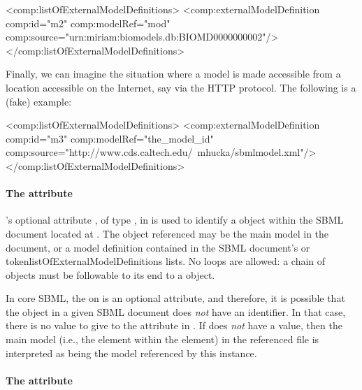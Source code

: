 \begin{example}
<comp:listOfExternalModelDefinitions>
    <comp:externalModelDefinition comp:id="m2" comp:modelRef="mod"
                                  comp:source="urn:miriam:biomodels.db:BIOMD0000000002"/>
</comp:listOfExternalModelDefinitions>
\end{example}

Finally, we can imagine the situation where a model is made accessible
from a location accessible on the Internet, say via the HTTP protocol.
The following is a (fake) example:

\begin{example}
<comp:listOfExternalModelDefinitions>
    <comp:externalModelDefinition comp:id="m3" comp:modelRef="the_model_id"
                                  comp:source="http://www.cds.caltech.edu/~mhucka/sbmlmodel.xml"/>
</comp:listOfExternalModelDefinitions>
\end{example}



\paragraph{The \fixttspace{} attribute}

\ExternalModelDefinition's optional attribute , of type
, in is used to identify a \Model object within the
SBML document located at .  The object referenced may be
the main model in the document, or a model definition contained in the
SBML document's  or 
token{listOfExternalModelDefinitions} lists.  No loops are allowed:
a chain of \ExternalModelDefinition objects must be followable to its end
to a \Model object.

In core SBML, the  on \Model is an optional attribute, and
therefore, it is possible that the \Model object in a given SBML
document does \emph{not} have an identifier.  In that case, there is no
value to give to the  attribute in
\ExternalModelDefinition.  If  does \emph{not} have a
value, then the main model (i.e., the  element within the
 element) in the referenced file is interpreted as being
the model referenced by this \ExternalModelDefinition instance.


\paragraph{The \fixttspace{} attribute}

